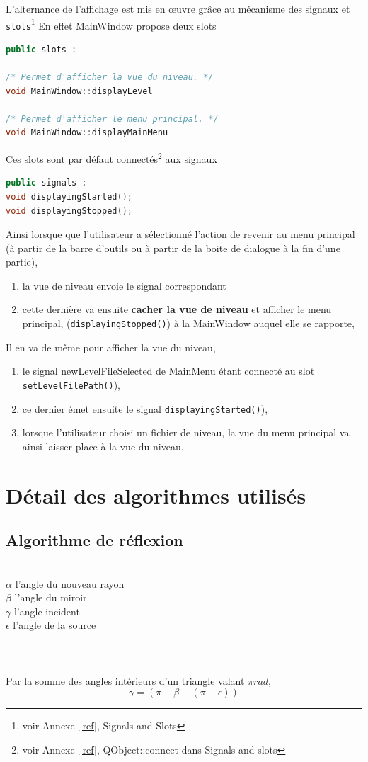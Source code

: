 \documentclass[a4paper,11pt]{report}
\begin{document}
L'alternance de l'affichage est mis en œuvre grâce au mécanisme des
signaux et \texttt{slots}\footnote{voir Annexe~\ref{ref}, Signals and Slots}
En effet MainWindow propose deux slots 
\begin{lstlisting}[title=MainWindow,frame=single,language=C++]
public slots :

/* Permet d'afficher la vue du niveau. */
void MainWindow::displayLevel 

/* Permet d'afficher le menu principal. */
void MainWindow::displayMainMenu 
\end{lstlisting}
Ces slots sont par défaut connectés\footnote{voir Annexe~\ref{ref},
QObject::connect dans Signals and slots} aux signaux 
\begin{lstlisting}[title=LevelView,frame=single,language=C++]
public signals : 
void displayingStarted();
void displayingStopped();
\end{lstlisting}
Ainsi lorsque que l'utilisateur a sélectionné l'action de revenir au menu
principal (à partir de la barre d'outils ou à partir de la boite de dialogue à
la fin d'une partie), 

\begin{enumerate}
	\item la vue de niveau envoie le signal correspondant
	\item cette dernière va ensuite \textbf{cacher la vue de niveau} et afficher le menu principal,
		(\texttt{displayingStopped()}) à la MainWindow auquel elle se rapporte, 
\end{enumerate}

Il en va de même pour afficher la vue du niveau, 
\begin{enumerate}
	\item le signal newLevelFileSelected de MainMenu étant connecté au slot
		\texttt{setLevelFilePath()}),
	\item ce dernier émet ensuite le signal \texttt{displayingStarted()}), 
	\item lorsque l'utilisateur choisi un fichier de niveau, la vue du
		menu principal va ainsi laisser place à la vue du niveau.
\end{enumerate}

\chapter[Algorithmes]{Détail des algorithmes utilisés}
\section[Réflexion]{Algorithme de réflexion}
 \\
$\alpha$ l'angle du nouveau rayon \\
$\beta$ l'angle du miroir \\
$\gamma$ l'angle incident \\
$\epsilon$ l'angle de la source \\ \\ \\ \\
Par la somme des angles intérieurs d'un triangle valant $\pi rad$, \\
$$\gamma = (\pi - \beta - (\pi - \epsilon))$$
\end{document}
